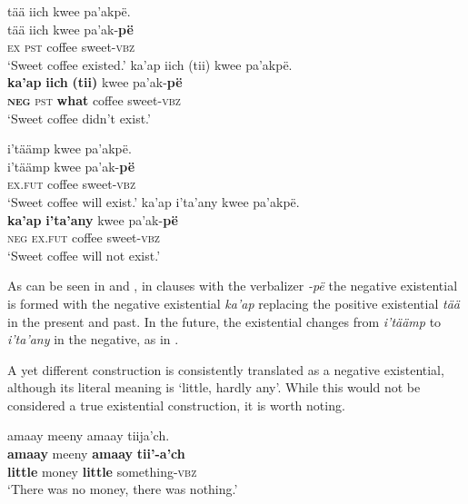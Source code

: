 \documentclass[output=paper,colorlinks,citecolor=brown,draft]{langscibook}
\begin{document}
\ea\label{ex:mix:63}
    \ea\label{ex:mix:63a}
        \glll tää iich kwee pa’akpë.\\ 
              tää iich kwee pa’ak-\textbf{pë}\\
              \textsc{ex} \textsc{pst} coffee sweet-\textsc{vbz}\\
        \glt ‘Sweet coffee existed.’
    \ex\label{ex:mix:63b}
        \glll  ka’ap iich (tii) kwee pa’akpë. \\
             \textbf{ka’ap} \textbf{iich} \textbf{(tii)} kwee pa’ak-\textbf{pë}\\
             \textbf{\textsc{neg}} \textsc{pst} \textbf{what} coffee sweet-\textsc{vbz}\\
        \glt ‘Sweet coffee didn’t exist.’
    \z
\z 
 
\ea\label{ex:mix:64}
    \ea\label{ex:mix:64a}
        \glll i'täämp kwee pa’akpë.\\ 
              i'täämp kwee pa’ak-\textbf{pë}\\
              \textsc{ex.fut} coffee sweet-\textsc{vbz}\\
        \glt ‘Sweet coffee will exist.’
    \ex\label{ex:mix:64b}
        \glll  ka’ap i’ta’any kwee pa’akpë.\\
             \textbf{ka’ap} \textbf{i’ta’any} kwee pa’ak-\textbf{pë}\\
             \textsc{neg} \textsc{ex.fut} coffee sweet-\textsc{vbz}\\
        \glt ‘Sweet coffee will not exist.’
    \z
\z 

As can be seen in  and , in clauses with the verbalizer \textit{{}-pë} the negative existential is formed with the negative existential \textit{ka’ap} replacing the positive existential \textit{tää} in the present and past. In the future, the existential changes from \textit{i’täämp} to \textit{i’ta’any} in the negative, as in . 

A yet different construction is consistently translated as a negative existential, although its literal meaning is ‘little, hardly any’. While this would not be considered a true existential construction, it is worth noting.



\ea\label{ex:mix:65}
    \glll amaay meeny amaay tiija’ch. \\
        \textbf{amaay} meeny \textbf{amaay} \textbf{tii’-a’ch} \\
        \textbf{little} money \textbf{little} something-\textsc{vbz} \\
    \glt ‘There was no money, there was nothing.’
\z
 
\end{document}
